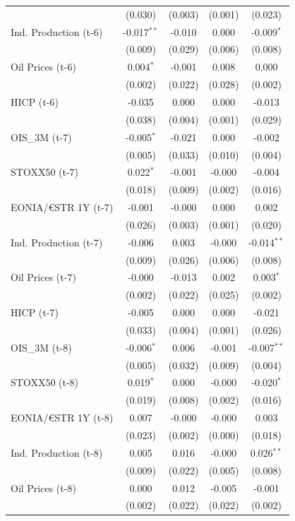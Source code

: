 \begin{longtable}[t]{lcccc}
 & (0.030) & (0.003) & (0.001) & (0.023)\\
Ind. Production (t-6) & -0.017$^{**}$ & -0.010 & 0.000 & -0.009$^{*}$\\
 & (0.009) & (0.029) & (0.006) & (0.008)\\
Oil Prices (t-6) & 0.004$^{*}$ & -0.001 & 0.008 & 0.000\\
 & (0.002) & (0.022) & (0.028) & (0.002)\\
HICP (t-6) & -0.035 & 0.000 & 0.000 & -0.013\\
 & (0.038) & (0.004) & (0.001) & (0.029)\\
OIS\_3M (t-7) & -0.005$^{*}$ & -0.021 & 0.000 & -0.002\\
 & (0.005) & (0.033) & (0.010) & (0.004)\\
STOXX50 (t-7) & 0.022$^{*}$ & -0.001 & -0.000 & -0.004\\
 & (0.018) & (0.009) & (0.002) & (0.016)\\
EONIA/€STR 1Y (t-7) & -0.001 & -0.000 & 0.000 & 0.002\\
 & (0.026) & (0.003) & (0.001) & (0.020)\\
Ind. Production (t-7) & -0.006 & 0.003 & -0.000 & -0.014$^{**}$\\
 & (0.009) & (0.026) & (0.006) & (0.008)\\
Oil Prices (t-7) & -0.000 & -0.013 & 0.002 & 0.003$^{*}$\\
 & (0.002) & (0.022) & (0.025) & (0.002)\\
HICP (t-7) & -0.005 & 0.000 & 0.000 & -0.021\\
 & (0.033) & (0.004) & (0.001) & (0.026)\\
OIS\_3M (t-8) & -0.006$^{*}$ & 0.006 & -0.001 & -0.007$^{**}$\\
 & (0.005) & (0.032) & (0.009) & (0.004)\\
STOXX50 (t-8) & 0.019$^{*}$ & 0.000 & -0.000 & -0.020$^{*}$\\
 & (0.019) & (0.008) & (0.002) & (0.016)\\
EONIA/€STR 1Y (t-8) & 0.007 & -0.000 & -0.000 & 0.003\\
 & (0.023) & (0.002) & (0.000) & \vphantom{1} (0.018)\\
Ind. Production (t-8) & 0.005 & 0.016 & -0.000 & 0.026$^{**}$\\
 & (0.009) & (0.022) & (0.005) & (0.008)\\
Oil Prices (t-8) & 0.000 & 0.012 & -0.005 & -0.001\\
 & (0.002) & (0.022) & (0.022) & (0.002)\\

\end{longtable}

